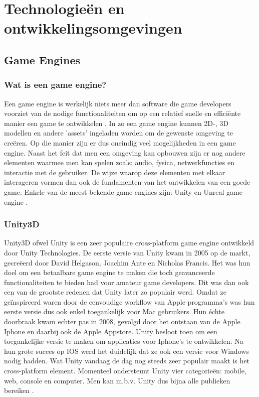 \section{Technologieën en ontwikkelingsomgevingen}
\subsection{Game Engines}
\subsubsection{Wat is een game engine?}
Een game engine is werkelijk niets meer dan software die game developers voorziet van de nodige functionaliteiten om op een relatief snelle en efficiënte manier een game te ontwikkelen \autocite{Oculus2017}. In zo een game engine kunnen 2D-, 3D modellen en andere 'assets' ingeladen worden om de gewenste omgeving te creëren. Op die manier zijn er dus oneindig veel mogelijkheden in een game engine. Naast het feit dat men een omgeving kan opbouwen zijn er nog andere elementen waarmee men kan spelen zoals: audio, fysica, netwerkfuncties en interactie met de gebruiker. De wijze  waarop deze elementen met elkaar interageren vormen dan ook de fundamenten van het ontwikkelen van een goede game. Enkele van de meest bekende game engines zijn: Unity en Unreal game engine \autocite{Staff2018}.

\subsubsection{Unity3D}

Unity3D ofwel Unity is een zeer populaire cross-platform game engine ontwikkeld door Unity Technologies.
De eerste versie van Unity kwam in 2005 op de markt, gecreëerd door David Helgason, Joachim Ante en Nicholas Francis. Het was hun doel om een betaalbare game engine te maken die toch geavanceerde functionaliteiten te bieden had voor amateur game developers. Dit was dan ook een van de grootste redenen dat Unity later zo populair werd. Omdat ze geïnspireerd waren door de eenvoudige workflow van Apple programma's was hun eerste versie dus ook enkel toegankelijk voor Mac gebruikers. Hun échte doorbraak kwam echter pas in 2008, gevolgd door het ontstaan van de Apple Iphone en daarbij ook de Apple Appstore. Unity besloot toen om een toegankelijke versie te maken om applicaties voor Iphone's te ontwikkelen. Na hun grote succes op IOS werd het duidelijk dat ze ook een versie voor Windows nodig hadden. Wat Unity vandaag de dag nog steeds zeer populair maakt is het cross-platform element. Momenteel ondersteunt Unity vier categorieën: mobile, web, console en computer. Men kan m.b.v. Unity dus bijna alle publieken bereiken \autocite{Haas2014}.

